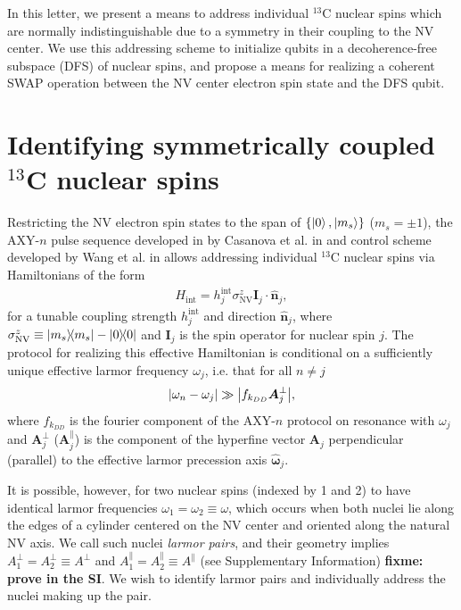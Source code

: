 \documentclass[twocolumn]{revtex4-1}
\renewcommand{\t}{\text} %
\renewcommand{\set}[1]{\left\{#1\right\}} %
\renewcommand{\v}{\bm} %
\newcommand{\uv}[1]{\hat{\v{#1}}} %
\renewcommand{\c}{\cdot} %
\newcommand{\NV}{\t{NV}}
\newcommand{\fixme}[1]{{\bf \color{red} fixme: #1}}
\begin{document}
In this letter, we present a means to address individual $^{13}$C
nuclear spins which are normally indistinguishable due to a symmetry
in their coupling to the NV center. We use this addressing scheme to
initialize qubits in a decoherence-free subspace (DFS) of nuclear
spins, and propose a means for realizing a coherent SWAP operation
between the NV center electron spin state and the DFS qubit.

\section{Identifying symmetrically coupled $^{13}$C nuclear spins}

Restricting the NV electron spin states to the span of
$\set{\ket0,\ket{m_s}}$ ($m_s=\pm1$), the AXY-$n$ pulse sequence
developed in by Casanova et al. in \cite{casanova2015robust} and
control scheme developed by Wang et al. in \cite{wang2016positioning}
allows addressing individual $^{13}$C nuclear spins via Hamiltonians
of the form
\begin{align}
  H_{\t{int}} = h_j^{\t{int}}\sigma_\NV^z\v I_j\c\uv n_j,
  \label{eq:H_int}
\end{align}
for a tunable coupling strength $h_j^{\t{int}}$ and direction
$\uv n_j$, where $\sigma_\NV^z\equiv\op{m_s}-\op{0}$ and $\v I_j$ is
the spin operator for nuclear spin $j$. The protocol for realizing
this effective Hamiltonian is conditional on a sufficiently unique
effective larmor frequency $\omega_j$, i.e. that for all $n\ne j$
\begin{align}
  \abs{\omega_n-\omega_j} \gg \abs{f_{k_{DD}}\v A_j^\perp},
\end{align}
where $f_{k_{DD}}$ is the fourier component of the AXY-$n$ protocol on
resonance with $\omega_j$ and $\v A_j^\perp$ ($\v A_j^\parallel$) is
the component of the hyperfine vector $\v A_j$ perpendicular
(parallel) to the effective larmor precession axis $\uv\omega_j$.

It is possible, however, for two nuclear spins (indexed by 1 and 2) to
have identical larmor frequencies $\omega_1=\omega_2\equiv\omega$,
which occurs when both nuclei lie along the edges of a cylinder
centered on the NV center and oriented along the natural NV axis. We
call such nuclei {\it larmor pairs}, and their geometry implies
$A_1^\perp=A_2^\perp\equiv A^\perp$ and
$A_1^\parallel=A_2^\parallel\equiv A^\parallel$ (see Supplementary
Information) \fixme{prove in the SI}. We wish to identify larmor
pairs and individually address the nuclei making up the pair.
\end{document}
